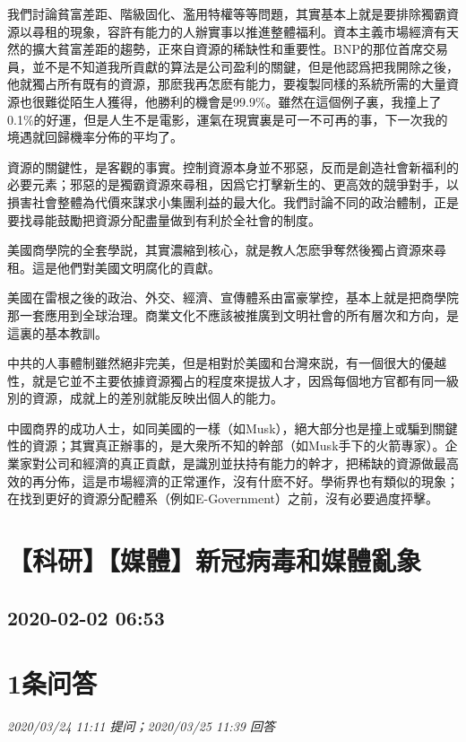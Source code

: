 \documentclass[twocolumn]{ctexart}
\begin{document}
我們討論貧富差距、階級固化、濫用特權等等問題，其實基本上就是要排除獨霸資源以尋租的現象，容許有能力的人辦實事以推進整體福利。資本主義市場經濟有天然的擴大貧富差距的趨勢，正來自資源的稀缺性和重要性。BNP的那位首席交易員，並不是不知道我所貢獻的算法是公司盈利的關鍵，但是他認爲把我開除之後，他就獨占所有既有的資源，那麽我再怎麽有能力，要複製同樣的系統所需的大量資源也很難從陌生人獲得，他勝利的機會是99.9\%。雖然在這個例子裏，我撞上了0.1\%的好運，但是人生不是電影，運氣在現實裏是可一不可再的事，下一次我的境遇就回歸機率分佈的平均了。

資源的關鍵性，是客觀的事實。控制資源本身並不邪惡，反而是創造社會新福利的必要元素；邪惡的是獨霸資源來尋租，因爲它打擊新生的、更高效的競爭對手，以損害社會整體為代價來謀求小集團利益的最大化。我們討論不同的政治體制，正是要找尋能鼓勵把資源分配盡量做到有利於全社會的制度。

美國商學院的全套學説，其實濃縮到核心，就是教人怎麽爭奪然後獨占資源來尋租。這是他們對美國文明腐化的貢獻。

美國在雷根之後的政治、外交、經濟、宣傳體系由富豪掌控，基本上就是把商學院那一套應用到全球治理。商業文化不應該被推廣到文明社會的所有層次和方向，是這裏的基本教訓。

中共的人事體制雖然絕非完美，但是相對於美國和台灣來説，有一個很大的優越性，就是它並不主要依據資源獨占的程度來提拔人才，因爲每個地方官都有同一級別的資源，成就上的差別就能反映出個人的能力。

中國商界的成功人士，如同美國的一樣（如Musk），絕大部分也是撞上或騙到關鍵性的資源；其實真正辦事的，是大衆所不知的幹部（如Musk手下的火箭專家）。企業家對公司和經濟的真正貢獻，是識別並扶持有能力的幹才，把稀缺的資源做最高效的再分佈，這是市場經濟的正常運作，沒有什麽不好。學術界也有類似的現象；在找到更好的資源分配體系（例如E-Government）之前，沒有必要過度抨擊。
\\


\section{【科研】【媒體】新冠病毒和媒體亂象}
\subsection{2020-02-02 06:53}


\section{1条问答}

\textit{\hfill\noindent\small 2020/03/24 11:11 提问；2020/03/25 11:39 回答}
\end{document}
